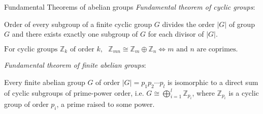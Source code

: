 \documentclass{beamer}
\newcommand\italictext[1]{\textcolor{italics}{\textit{#1}}}
\begin{document}
\begin{frame}{Fundamental Theorems of abelian groups}
    \italictext{Fundamental theorem of cyclic groups}:
    \begin{theorem}
        Order of every subgroup of a finite cyclic group $G$ divides the order $\lvert G\rvert$ of group $G$ and there exists exactly one subgroup of $G$ for each divisor of $\lvert G\rvert$. 
    \end{theorem}
    \begin{lemma}
        $\text{For cyclic groups }\mathbb{Z}_k\text{ of order }k,\text{ }\mathbb{Z}_{mn}\cong\mathbb{Z}_m\oplus\mathbb{Z}_n\Leftrightarrow m \text{ and } n\text{ are coprimes.}$
    \end{lemma}
    \italictext{Fundamental theorem of finite abelian groups}:
    \begin{theorem}
        Every finite abelian group $G$ of order $\lvert G\rvert=p_1p_2\cdots p_l$ is isomorphic to a direct sum of cyclic subgroups of prime-power order, i.e. $G\cong\bigoplus\limits_{i=1}^{l} \mathbb{Z}_{p_i}$, where $\mathbb{Z}_{p_i}$ is a cyclic group of order $p_i$, a prime raised to some power.
    \end{theorem}
\end{frame}
\end{document}

